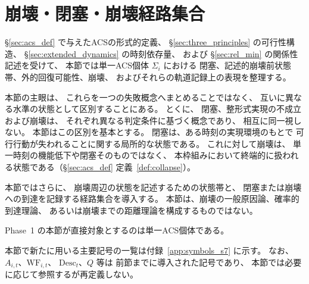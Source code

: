 \section{崩壊・閉塞・崩壊経路集合}
\label{sec:collapse_cond}

\S\ref{sec:acs_def} で与えたACSの形式的定義、
\S\ref{sec:three_principles} の可行性構造、
\S\ref{sec:extended_dynamics} の時刻依存量、
および
\S\ref{sec:rel_min} の関係性記述を受けて、
本節では単一ACS個体 $\Sigma_i$ における
閉塞、記述的崩壊前状態帯、外的回復可能性、崩壊、
およびそれらの軌道記録上の表現を整理する。

本節の主眼は、
これらを一つの失敗概念へまとめることではなく、
互いに異なる水準の状態として区別することにある。
とくに、
閉塞、整形式実現の不成立および崩壊は、
それぞれ異なる判定条件に基づく概念であり、
相互に同一視しない。
本節はこの区別を基本とする。
閉塞は、ある時刻の実現環境のもとで
可行行動が失われることに関する局所的な状態である。
これに対して崩壊は、
単一時刻の機能低下や閉塞そのものではなく、
本枠組みにおいて終端的に扱われる状態である（\S\ref{sec:acs_def} 定義~\ref{def:collapse}）。

本節ではさらに、
崩壊周辺の状態を記述するための状態帯と、
閉塞または崩壊への到達を記録する経路集合を導入する。
本節は、崩壊の一般原因論、確率的到達理論、
あるいは崩壊までの距離理論を構成するものではない。

Phase~1 の本節が直接対象とするのは単一ACS個体である。

本節で新たに用いる主要記号の一覧は付録~\ref{app:symbols_s7} に示す。
なお、
$A_{i,t}$、$\mathrm{WF}_{i,t}$、
$\mathrm{Desc}_t$、$Q$ 等は
前節までに導入された記号であり、
本節では必要に応じて参照するが再定義しない。

